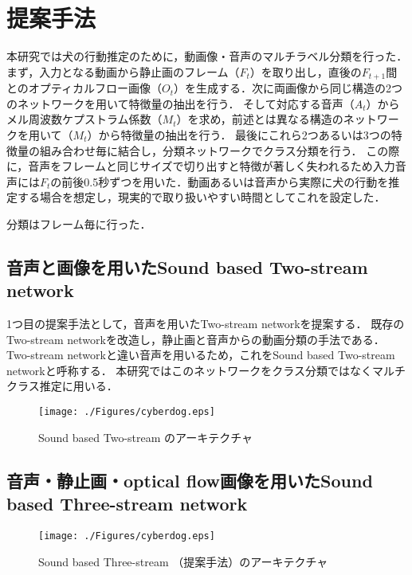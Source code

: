\chapter{提案手法}
本研究では犬の行動推定のために，動画像・音声のマルチラベル分類を行った．
まず，入力となる動画から静止画のフレーム（$F_t$）を取り出し，直後の$F_{t+1}$間とのオプティカルフロー画像（$O_t$）を生成する．次に両画像から同じ構造の2つのネットワークを用いて特徴量の抽出を行う．
そして対応する音声（$A_t$）からメル周波数ケプストラム係数（$M_t$）を求め，前述とは異なる構造のネットワークを用いて（$M_t$）から特徴量の抽出を行う．
最後にこれら2つあるいは3つの特徴量の組み合わせ毎に結合し，分類ネットワークでクラス分類を行う．
この際に，音声をフレームと同じサイズで切り出すと特徴が著しく失われるため入力音声には$F_t$の前後0.5秒ずつを用いた．動画あるいは音声から実際に犬の行動を推定する場合を想定し，現実的で取り扱いやすい時間としてこれを設定した．

分類はフレーム毎に行った．
\section{音声と画像を用いたSound based Two-stream network}
1つ目の提案手法として，音声を用いたTwo-stream networkを提案する．
既存のTwo-stream networkを改造し，静止画と音声からの動画分類の手法である．
Two-stream networkと違い音声を用いるため，これをSound based Two-stream networkと呼称する．
本研究ではこのネットワークをクラス分類ではなくマルチクラス推定に用いる．

\begin{figure}[htbp]
 \begin{center}
  \texttt{[image: ./Figures/cyberdog.eps]}
  \caption{Sound based Two-stream のアーキテクチャ}
  \label{sound-two-stream}
 \end{center}
\end{figure}



\section{音声・静止画・optical flow画像を用いたSound based Three-stream network}

\begin{figure}[htbp]
 \begin{center}
  \texttt{[image: ./Figures/cyberdog.eps]}
  \caption{Sound based Three-stream （提案手法）のアーキテクチャ}
  \label{sound-three-stream}
 \end{center}
\end{figure}
